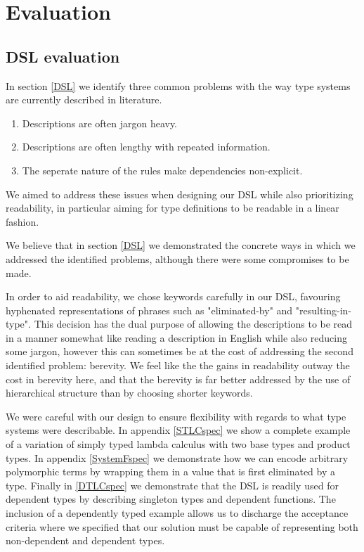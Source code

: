 \chapter{Evaluation}

\section{DSL evaluation}
\label{chapter-DSL-eval}

In section \ref{DSL} we identify three common problems with the way type
systems are currently described in literature.

\begin{enumerate}
\item Descriptions are often jargon heavy.
\item Descriptions are often lengthy with repeated information.
\item The seperate nature of the rules make dependencies non-explicit.
\end{enumerate}

We aimed to address these issues when designing our DSL while also
prioritizing readability, in particular aiming for type definitions
to be readable in a linear fashion.

We believe that in section \ref{DSL} we demonstrated the concrete
ways in which we addressed the identified problems, although there
were some compromises to be made.

In order to aid readability, we chose keywords carefully in our
DSL, favouring hyphenated representations of phrases such as
"eliminated-by" and "resulting-in-type". This decision has the dual
purpose of allowing the descriptions to be read in a manner somewhat
like reading a description in English while also reducing some jargon,
however this can sometimes be at the cost of addressing the second
identified problem: berevity. We feel like the the gains in
readability outway the cost in berevity here, and that the berevity is
far better addressed by the use of hierarchical structure than by
choosing shorter keywords. 

We were careful with our design to ensure flexibility with regards to
what type systems were describable. In appendix \ref{STLCspec} we show
a complete example of a variation of simply typed lambda calculus with
two base types and product types. In appendix \ref{SystemFspec} we
demonstrate how we can encode arbitrary polymorphic terms by wrapping
them in a value that is first eliminated by a type. Finally in
\ref{DTLCspec} we demonstrate that the DSL is readily used for
dependent types by describing singleton types and dependent
functions. The inclusion of a dependently typed example allows us to
discharge the acceptance criteria where we specified that our solution
must be capable of representing both non-dependent and dependent types.

